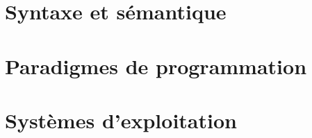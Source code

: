 \section{Syntaxe et sémantique}
\label{sec:informatique:syntaxe}

\section{Paradigmes de programmation}
\label{sec:informatique:paradigmes}

\section{Systèmes d'exploitation}
\label{sec:informatique:os}



